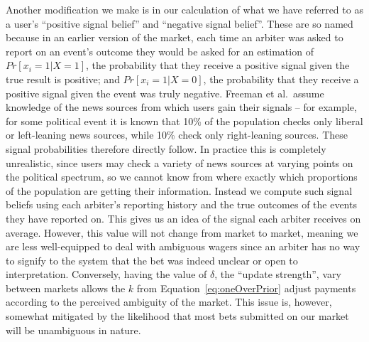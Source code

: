Another modification we make is in our calculation of what we have referred to
as a user's ``positive signal belief'' and ``negative signal belief''. These
are so named because in an earlier version of the market, each time an arbiter
was asked to report on an event's outcome they would be asked for an estimation
of $Pr[x_i=1|X=1]$, the probability that they receive a positive signal given
the true result is positive; and $Pr[x_i=1|X=0]$, the probability that they
receive a positive signal given the event was truly negative. Freeman et al.\
assume knowledge of the news sources from which users gain their signals -- for
example, for some political event it is known that 10\% of the population
checks only liberal or left-leaning news sources, while 10\% check only
right-leaning sources. These signal probabilities therefore directly follow. In
practice this is completely unrealistic, since users may check a variety of
news sources at varying points on the political spectrum, so we cannot know
from where exactly which proportions of the population are getting their
information. Instead we compute such signal beliefs using each arbiter's
reporting history and the true outcomes of the events they have reported on.
This gives us an idea of the signal each arbiter receives on average. However,
this value will not change from market to market, meaning we are less
well-equipped to deal with ambiguous wagers since an arbiter has no way to
signify to the system that the bet was indeed unclear or open to
interpretation. Conversely, having the value of $\delta$, the ``update
strength'', vary between markets allows the $k$ from
Equation~\ref{eq:oneOverPrior} adjust payments according to the perceived
ambiguity of the market. This issue is, however, somewhat mitigated by the
likelihood that most bets submitted on our market will be unambiguous in
nature.


